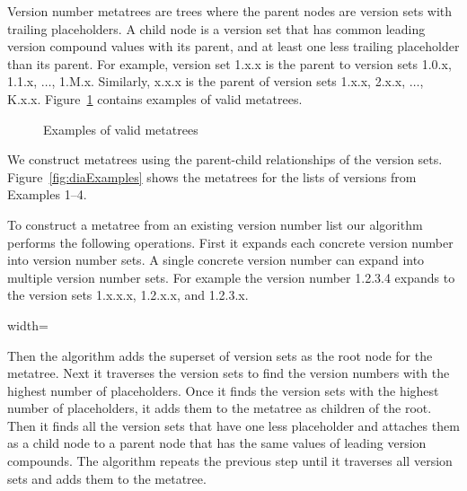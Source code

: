 \documentclass[conference]{IEEEtran}
\begin{document}
Version number metatrees are trees where the parent nodes are version sets with trailing placeholders. A child node is a version set that has common leading version compound values with its parent, and at least one less trailing placeholder than its parent. For example, version set 1.x.x is the parent to version sets 1.0.x, 1.1.x, $\dots$, 1.M.x.  Similarly, x.x.x is the parent of version sets 1.x.x, 2.x.x, $\dots$, K.x.x.  
Figure~\ref{fig:validMetatrees} contains examples of valid metatrees.

\begin{figure}
\begin{center}

\end{center}
\caption{Examples of valid metatrees}
\label{fig:validMetatrees}
\end{figure}





We construct metatrees using the parent-child relationships of the version sets.
Figure~\ref{fig:diaExamples} shows the metatrees for the lists of versions from Examples 1--4. 

To construct a metatree from an existing version number list our algorithm performs the following operations.
First it expands each concrete version number into version number sets.
A single concrete version number can expand into multiple version number sets.
For example the version number 1.2.3.4 expands to the version sets 1.x.x.x, 1.2.x.x, and 1.2.3.x. 

\begin{figure*}
 \begin{adjustbox}{width=\textwidth}

\end{adjustbox}
\caption{Examples of metatrees. The bolded version numbers are the existing version numbers for the example projects and the italicized version numbers are the \choices.}
\label{fig:diaExamples}
\end{figure*}


Then the algorithm adds the superset of version sets as the root node for the metatree.
Next it traverses the version sets to find the version numbers with the highest number of placeholders.
Once it finds the version sets with the highest number of placeholders, it adds them to the metatree as children of the root.
Then it finds all the version sets that have one less placeholder and attaches them as a child node to a parent node that has the same values of leading version compounds.
The algorithm repeats the previous step until it traverses all version sets and adds them to the metatree.
\end{document}

